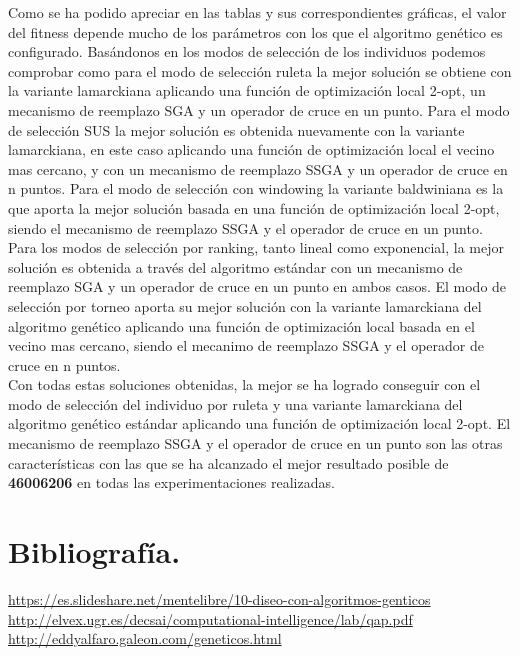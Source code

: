 \documentclass[10pt]{article}
\begin{document}
Como se ha podido apreciar en las tablas y sus correspondientes gráficas, el valor del fitness depende mucho de los parámetros con los que el algoritmo genético es configurado. Basándonos en los modos de selección de los individuos podemos comprobar como para el modo de selección ruleta la mejor solución se obtiene con la variante lamarckiana aplicando una función de optimización local 2-opt, un mecanismo de reemplazo SGA y un operador de cruce en un punto. Para el modo de selección SUS la mejor solución es obtenida nuevamente con la variante lamarckiana, en este caso aplicando una función de optimización local el vecino mas cercano, y con un mecanismo de reemplazo SSGA y un operador de cruce en n puntos. Para el modo de selección con windowing la variante baldwiniana es la que aporta la mejor solución basada en una función de optimización local 2-opt, siendo el mecanismo de reemplazo SSGA y el operador de cruce en un punto. Para los modos de selección por ranking, tanto lineal como exponencial, la mejor solución es obtenida a través del algoritmo estándar con un mecanismo de reemplazo SGA y un operador de cruce en un punto en ambos casos. El modo de selección por torneo aporta su mejor solución con la variante lamarckiana del algoritmo genético aplicando una función de optimización local basada en el vecino mas cercano, siendo el mecanimo de reemplazo SSGA y el operador de cruce en n puntos. \\

Con todas estas soluciones obtenidas, la mejor se ha logrado conseguir con el modo de selección del individuo por ruleta y una variante lamarckiana del algoritmo genético estándar aplicando una función de optimización local 2-opt. El mecanismo de reemplazo SSGA y el operador de cruce en un punto son las otras características con las que se ha alcanzado el mejor resultado posible de \textbf{46006206} en todas las experimentaciones realizadas. \\

\section{Bibliografía.}  

\url{https://es.slideshare.net/mentelibre/10-diseo-con-algoritmos-genticos}\\

\url{http://elvex.ugr.es/decsai/computational-intelligence/lab/qap.pdf}\\

\url{http://eddyalfaro.galeon.com/geneticos.html}\\
\end{document}
